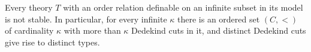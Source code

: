 Every theory $T$ with an order relation definable on an infinite subset in its model is not stable. In particular, for every infinite $\kappa$ there is an ordered set $(C, <)$ of cardinality $\kappa$ with more than $\kappa$ Dedekind cuts in it, and distinct Dedekind cuts give rise to distinct types.
